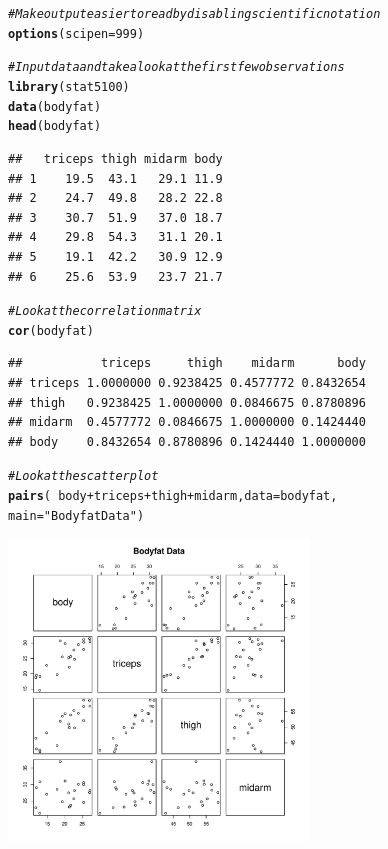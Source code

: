 \documentclass{article}\usepackage[]{graphicx}\usepackage[]{color}
\makeatletter
\newcommand{\hlnum}[1]{\textcolor[rgb]{0.686,0.059,0.569}{#1}}%
\newcommand{\hlstr}[1]{\textcolor[rgb]{0.192,0.494,0.8}{#1}}%
\newcommand{\hlcom}[1]{\textcolor[rgb]{0.678,0.584,0.686}{\textit{#1}}}%
\newcommand{\hlopt}[1]{\textcolor[rgb]{0,0,0}{#1}}%
\newcommand{\hlstd}[1]{\textcolor[rgb]{0.345,0.345,0.345}{#1}}%
\newcommand{\hlkwc}[1]{\textcolor[rgb]{0.333,0.667,0.333}{#1}}%
\newcommand{\hlkwd}[1]{\textcolor[rgb]{0.737,0.353,0.396}{\textbf{#1}}}%
\newenvironment{kframe}{%
 \def\at@end@of@kframe{}%
 \ifinner\ifhmode%
  \def\at@end@of@kframe{\end{minipage}}%
  \begin{minipage}{\columnwidth}%
 \fi\fi%
 \def\FrameCommand##1{\hskip\@totalleftmargin \hskip-\fboxsep
 \colorbox{shadecolor}{##1}\hskip-\fboxsep
     \hskip-\linewidth \hskip-\@totalleftmargin \hskip\columnwidth}%
 \MakeFramed {\advance\hsize-\width
   \@totalleftmargin\z@ \linewidth\hsize
   \@setminipage}}%
 {\par\unskip\endMakeFramed%
 \at@end@of@kframe}
\newenvironment{knitrout}{}{} %
\makeatother
\begin{document}
\begin{knitrout}
\color{fgcolor}\begin{kframe}
\begin{alltt}
\hlcom{# Make output easier to read by disabling scientific notation}
\hlkwd{options}\hlstd{(}\hlkwc{scipen} \hlstd{=} \hlnum{999}\hlstd{)}

\hlcom{# Input data and take a look at the first few observations}
\hlkwd{library}\hlstd{(stat5100)}
\hlkwd{data}\hlstd{(bodyfat)}
\hlkwd{head}\hlstd{(bodyfat)}
\end{alltt}
\begin{verbatim}
##   triceps thigh midarm body
## 1    19.5  43.1   29.1 11.9
## 2    24.7  49.8   28.2 22.8
## 3    30.7  51.9   37.0 18.7
## 4    29.8  54.3   31.1 20.1
## 5    19.1  42.2   30.9 12.9
## 6    25.6  53.9   23.7 21.7
\end{verbatim}
\begin{alltt}
\hlcom{# Look at the correlation matrix}
\hlkwd{cor}\hlstd{(bodyfat)}
\end{alltt}
\begin{verbatim}
##           triceps     thigh    midarm      body
## triceps 1.0000000 0.9238425 0.4577772 0.8432654
## thigh   0.9238425 1.0000000 0.0846675 0.8780896
## midarm  0.4577772 0.0846675 1.0000000 0.1424440
## body    0.8432654 0.8780896 0.1424440 1.0000000
\end{verbatim}
\begin{alltt}
\hlcom{# Look at the scatterplot}
\hlkwd{pairs}\hlstd{(} \hlopt{~} \hlstd{body} \hlopt{+} \hlstd{triceps} \hlopt{+} \hlstd{thigh} \hlopt{+} \hlstd{midarm,} \hlkwc{data} \hlstd{= bodyfat,}
       \hlkwc{main} \hlstd{=} \hlstr{"Bodyfat Data"}\hlstd{)}
\end{alltt}
\end{kframe}
\includegraphics[width=0.6\textwidth]{figure/unnamed-chunk-1-1} 

\end{knitrout}
\end{document}
